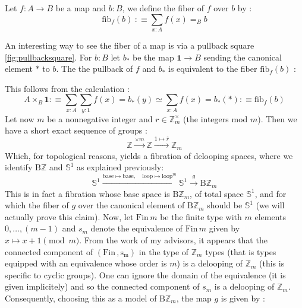 \documentclass{report}
\begin{document}
\begin{mydef}
  Let $f : A \rightarrow B$ be a map and $b : B$, we define the fiber of $f$ over $b$ by : 
  $$\mathrm{fib}_f(b) \hspace{3pt} :\equiv \sum_{x: A} f(x)=_B b$$
\end{mydef}
An interesting way to see the fiber of a map is via a pullback square \ref{fig:pullbacksquare}. For $b :B$ let $b_*$ be the map $\mathbf{1} \rightarrow B$ sending the canonical element $*$ to $b$. The the pullback of $f$ and $b_*$ is equivalent to the fiber $\mathrm{fib}_f(b)$ : 
\begin{center}
\end{center}
This follows from the calculation : 
$$
A \times_B \textbf{1} :
\equiv \sum_{x :A} \sum_{y : \textbf{1}} f(x)=b_*(y)
\simeq \sum_{x : A} f(x)=b_*(*) 
:\equiv\mathrm{fib}_f(b)
$$
Let now $m$ be a nonnegative integer and $r \in \mathbb{Z}_m^{\times}$ (the integers mod $m$). Then we have a short exact sequence of groups : 
$$\mathbb{Z} \xrightarrow{\times m} \mathbb{Z} \xrightarrow{1 \mapsto \overline r} \mathbb Z_m$$
Which, for  topological reasons, yields a fibration of delooping spaces, where we identify $\mathrm{B}\mathbb Z$ and $\mathbb S^1$ as explained previously:
$$\mathbb{S}^1 \xrightarrow{\mathrm{base} \mapsto \mathrm{base}, \quad  \mathrm{loop} \mapsto \mathrm{loop}^m} \mathbb{S}^1 \xrightarrow{g} \mathrm{B}\mathbb{Z}_m$$
This is in fact a fibration whose base space is $\mathrm{B}\mathbb{Z}_m$, of total space $\mathbb{S}^1$, and for which the fiber of $g$ over the canonical element of $\mathrm{B}\mathbb{Z}_m$ should be $\mathbb{S}^1$ (we will actually prove this claim). Now, let $\mathrm{Fin} \hspace{2pt} m$ be the finite type with $m$ elements $0,\ldots, (m-1)$ and $s_m$ denote the equivalence of $\mathrm{Fin} \hspace{2pt} m$ given by $x\mapsto x+1 \pmod m$. From the work of my advisors, it appears that the connected component of $(\mathrm{Fin \hspace{2pt}, s_m})$ in the type of $\mathbb Z_m$ types (that is types equipped with an equivalence whose order is $m$) is a delooping of $\mathbb{Z}_m$ (this is specific to cyclic groups). One can ignore the domain of the equivalence (it is given implicitely) and so the connected component of $s_m$ is a delooping of $\mathbb Z_m$. Consequently, choosing this as a model of $\mathrm{B}\mathbb{Z}_m$, the map $g$ is given by : 
\end{document}
